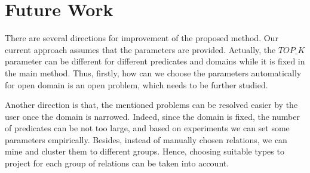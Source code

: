 \documentclass{acm_proc_article-sp}
\begin{document}
\section{Future Work}

There are several directions for improvement of the proposed method. Our current approach assumes that the parameters are provided. Actually, the $TOP\_K$ parameter can be different for different predicates and domains while it is fixed in the main method. Thus, firstly, how can we choose the parameters automatically for open domain is an open problem, which needs to be further studied.

Another direction is that, the mentioned problems can be resolved easier by the user once the domain is narrowed. Indeed, since the domain is fixed, the number of predicates can be not too large, and based on experiments we can set some parameters empirically. Besides, instead of manually chosen relations, we can mine and cluster them to different groups. Hence, choosing suitable types to project for each group of relations can be taken into account.



\end{document}
